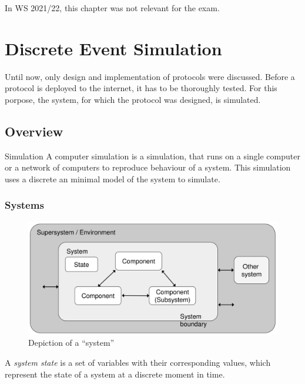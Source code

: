 \documentclass[english]{panikzettel}
\begin{document}
	\begin{alertbox}
		In WS 2021/22, this chapter was not relevant for the exam.
	\end{alertbox}

	\section{Discrete Event Simulation}
	\label{s:discrete-event-simulation}

	Until now, only design and implementation of protocols were discussed.
	Before a protocol is deployed to the internet, it has to be thoroughly tested. 
	For this porpose, the system, for which the protocol was designed, is simulated. 

	\subsection{Overview}
	\label{ss:discrete-event-simulation:overview}
	
	\begin{defi}{Simulation}
		A computer simulation is a simulation, that runs on a single computer or a network of computers to reproduce behaviour of a system. This simulation uses a discrete an minimal model of the system to simulate.
	\end{defi}

	\subsubsection{Systems}
	\label{sss:overview:systems} 

	\begin{figure}[H]
		\centering
		\includegraphics[width=\textwidth]{img/5-system.png}
		\caption{Depiction of a \enquote{system}}
		\label{img-5-system}
	\end{figure}
	
	A \textit{system state} is a set of variables with their corresponding values, which represent the state of a system at a discrete moment in time.	
\end{document}

